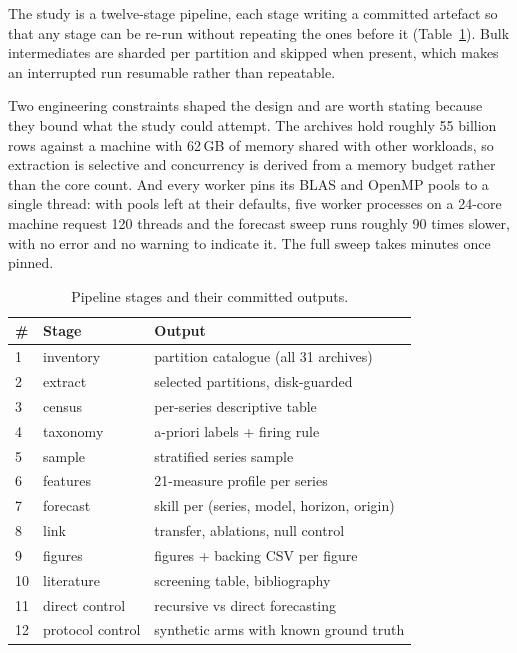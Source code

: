 \documentclass[11pt,a4paper]{article}
\newcommand{\num}[1]{#1}
\begin{document}
The study is a twelve-stage pipeline, each stage writing a committed artefact so
that any stage can be re-run without repeating the ones before it
(Table~\ref{tab:pipeline}). Bulk intermediates are sharded per partition and
skipped when present, which makes an interrupted run resumable rather than
repeatable.

Two engineering constraints shaped the design and are worth stating because they
bound what the study could attempt. The archives hold roughly \num{55} billion
rows against a machine with \num{62}\,GB of memory shared with other workloads,
so extraction is selective and concurrency is derived from a memory budget rather
than the core count. And every worker pins its BLAS and OpenMP pools to a single
thread: with pools left at their defaults, five worker processes on a 24-core
machine request 120 threads and the forecast sweep runs roughly \num{90} times
slower, with no error and no warning to indicate it. The full sweep takes minutes
once pinned.

\begin{table}[t]
\centering
\caption{Pipeline stages and their committed outputs.}
\label{tab:pipeline}
\small
\begin{tabular}{llp{2.9cm}}
\toprule
\# & Stage & Output \\
\midrule
1 & inventory & partition catalogue (all 31 archives) \\
2 & extract & selected partitions, disk-guarded \\
3 & census & per-series descriptive table \\
4 & taxonomy & a-priori labels + firing rule \\
5 & sample & stratified series sample \\
6 & features & \num{21}-measure profile per series \\
7 & forecast & skill per (series, model, horizon, origin) \\
8 & link & transfer, ablations, null control \\
9 & figures & figures + backing CSV per figure \\
10 & literature & screening table, bibliography \\
11 & direct control & recursive vs direct forecasting \\
12 & protocol control & synthetic arms with known ground truth \\
\bottomrule
\end{tabular}
\end{table}
\end{document}
